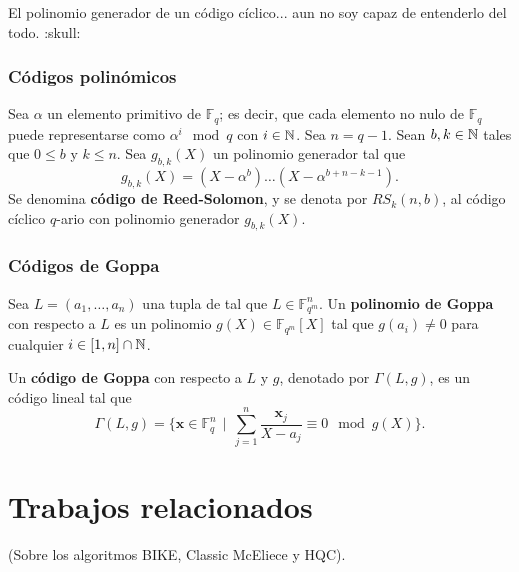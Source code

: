 \begin{definition}
	El polinomio generador de un código cíclico... aun no soy capaz de entenderlo del todo. :skull:
\end{definition}

\subsubsection{Códigos polinómicos}

\begin{definition}
	Sea $\alpha$ un elemento primitivo de $\mathbb{F}_q$; es decir, que cada elemento no nulo de $\mathbb{F}_q$ puede representarse como $\alpha^i \mod q$ con $i \in \mathbb{N}$. Sea $n = q - 1$. Sean $b, k \in \mathbb{N}$ tales que $0 \leq b$ y $k \leq n$. Sea $g_{b,k}(X)$ un polinomio generador tal que
	\[g_{b,k}(X) = (X - \alpha^b)\hdots(X - \alpha^{b+n-k-1}).\]
	Se denomina \textbf{código de Reed-Solomon}, y se denota por $RS_k(n, b)$, al código cíclico $q$-ario con polinomio generador $g_{b,k}(X)$.
\end{definition}

\subsubsection{Códigos de Goppa}

\begin{definition}
	Sea $L = (a_1, \dots, a_n)$ una tupla de tal que $L \in \mathbb{F}_{q^m}^n$. Un \textbf{polinomio de Goppa} con respecto a $L$ es un polinomio $g(X) \in \mathbb{F}_{q^m}[X]$ tal que $g(a_i) \neq 0$ para cualquier $i \in [1, n] \cap \mathbb{N}$.
\end{definition}

\begin{definition}
	Un \textbf{código de Goppa} con respecto a $L$ y $g$, denotado por $\Gamma(L, g)$, es un código lineal tal que
	\[\Gamma(L, g) = \bigg\{\textbf{x} \in \mathbb{F}_q^n \ \ \bigg|\ \ \sum_{j=1}^n \frac{\textbf{x}_j}{X - a_j} \equiv 0 \mod g(X)\bigg\}.\]
\end{definition}

\section{Trabajos relacionados}

(Sobre los algoritmos BIKE, Classic McEliece y HQC).
